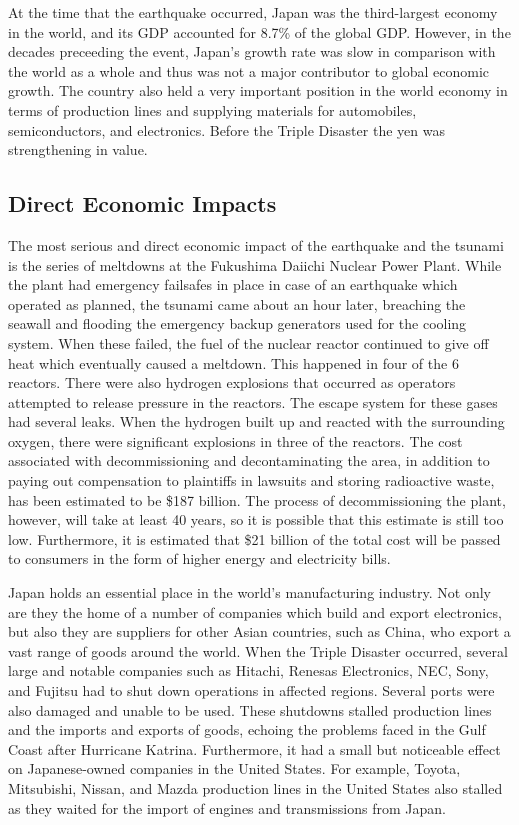 \documentclass[%
 reprint,
 amsmath,amssymb,
 aps,
]{revtex4-1}
\begin{document}
At the time that the earthquake occurred, Japan was the third-largest economy in the world, and its GDP accounted for 8.7\% of the global GDP. However, in the decades preceeding the event, Japan's growth rate was slow in comparison with the world as a whole and thus was not a major contributor to global economic growth. The country also held a very important position in the world economy in terms of production lines and supplying materials for automobiles, semiconductors, and electronics. Before the Triple Disaster the yen was strengthening in value. \cite{nanto_2011} 

\subsection{\label{sec:level2} Direct Economic Impacts}

The most serious and direct economic impact of the earthquake and the tsunami is the series of meltdowns at the Fukushima Daiichi Nuclear Power Plant. While the plant had emergency failsafes in place in case of an earthquake which operated as planned, the tsunami came about an hour later, breaching the seawall and flooding the emergency backup generators used for the cooling system. When these failed, the fuel of the nuclear reactor continued to give off heat which eventually caused a meltdown. This happened in four of the 6 reactors. There were also hydrogen explosions that occurred as operators attempted to release pressure in the reactors. The escape system for these gases had several leaks. When the hydrogen built up and reacted with the surrounding oxygen, there were significant explosions in three of the reactors. \cite{youtube_2012} The cost associated with decommissioning and decontaminating the area, in addition to paying out compensation to plaintiffs in lawsuits and storing radioactive waste, has been estimated to be \$187 billion. The process of decommissioning the plant, however, will take at least 40 years, so it is possible that this estimate is still too low. Furthermore, it is estimated that \$21 billion of the total cost will be passed to consumers in the form of higher energy and electricity bills. \cite{mccurry_2017}

Japan holds an essential place in the world's manufacturing industry. Not only are they the home of a number of companies which build and export electronics, but also they are suppliers for other Asian countries, such as China, who export a vast range of goods around the world. When the Triple Disaster occurred, several large and notable companies such as Hitachi, Renesas Electronics, NEC, Sony, and Fujitsu had to shut down operations in affected regions. Several ports were also damaged and unable to be used. These shutdowns stalled production lines and the imports and exports of goods, echoing the problems faced in the Gulf Coast after Hurricane Katrina. Furthermore, it had a small but noticeable effect on Japanese-owned companies in the United States. For example, Toyota, Mitsubishi, Nissan, and Mazda production lines in the United States also stalled as they waited for the import of engines and transmissions from Japan. \cite{nanto_2011}
\end{document}
